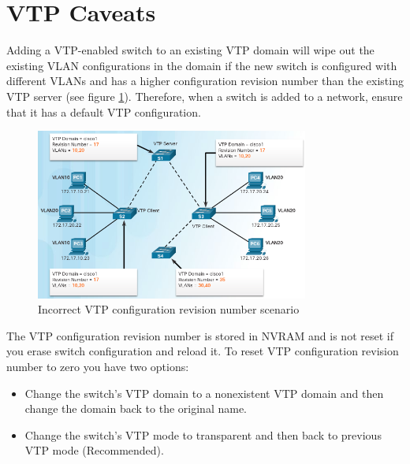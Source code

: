\section{VTP Caveats}

Adding a VTP-enabled switch to an existing VTP domain will wipe out the existing VLAN configurations in the domain if the new switch is configured with different VLANs and has a higher configuration revision number than the existing VTP server (see figure \ref{VTP-caveats}). Therefore, when a switch is added to a network, ensure that it has a default VTP configuration.\\

\begin{figure}[hbtp]
\centering
\includegraphics[width=0.8\textwidth]{pictures/VTP-caveats.png}
\caption{Incorrect VTP configuration revision number scenario}
\label{VTP-caveats}
\end{figure}

The VTP configuration revision number is stored in NVRAM and is not reset if you erase switch configuration and reload it. To reset VTP configuration revision number to zero you have two options:

\begin{itemize}
\item Change the switch's VTP domain to a nonexistent VTP domain and then change the domain back to the original name.
\item Change the switch's VTP mode to transparent and then back to previous VTP mode (Recommended).
\end{itemize}
